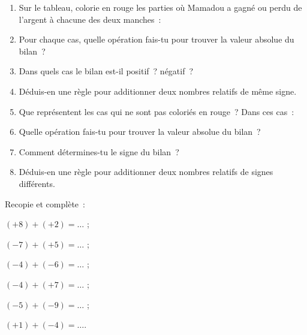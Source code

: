 \begin{activite}
\begin{partie}
\begin{enumerate}
 \item Sur le tableau, colorie en rouge les parties où Mamadou a gagné ou perdu de l'argent à chacune des deux manches :
 \item Pour chaque cas, quelle opération fais-tu pour trouver la valeur absolue du bilan ? 
 \item Dans quels cas le bilan est-il positif ? négatif ?
 \item Déduis-en une règle pour additionner deux nombres relatifs de même signe.
 \item Que représentent les cas qui ne sont pas coloriés en rouge ? Dans ces cas :
 \item Quelle opération fais-tu pour trouver la valeur absolue du bilan ? 
 \item Comment détermines-tu le signe du bilan ? 
 \item Déduis-en une règle pour additionner deux nombres relatifs de signes différents. 
 \end{enumerate}
\end{partie}

\begin{partie}
Recopie et complète :
\begin{colenumerate}{3}
 \item $(+8) + (+2) = \ldots$ ;
 \item $(-7) + (+5) = \ldots$ ;
 \item $(-4) + (-6) = \ldots$ ;
 \item $(-4) + (+7) = \ldots$ ;
 \item $(-5) + (-9) = \ldots$ ;
 \item $(+1) + (-4) = \ldots$.
 \end{colenumerate}
\end{partie}

\end{activite}


